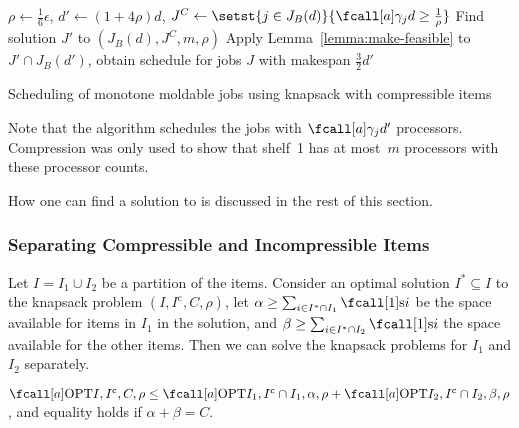 \begin{algorithm}
  $\rho \leftarrow \frac{1}{6}\epsilon$, $d' \leftarrow (1+4\rho)d$,
  $J^C \leftarrow \setst{j \in J_B(d)}{\procnum{j}{d} \geq \frac{1}{\rho}}$ \;
  Find solution $J'$ to $(J_B(d), J^C, m, \rho)$ \label{line:knapsack}\;
  Apply Lemma~\ref{lemma:make-feasible} to $J' \cap J_B(d')$,
    obtain schedule for jobs $J$ with makespan $\frac{3}{2}d'$ \label{line:final-schedule}\;
  
  \caption{Scheduling of monotone moldable jobs using knapsack with compressible items}
  \label{alg:scheduling-simple}
\end{algorithm}

Note that the algorithm schedules the jobs
with $\procnum{j}{d'}$ processors.
Compression was only used to show that
shelf~1 has at most~$m$ processors with these processor counts.

How one can find a solution to is discussed in the rest of this section.


\subsubsection{Separating Compressible and Incompressible Items}

Let $I = I_1 \cup I_2$ be a partition of the items.
Consider an optimal solution $I^* \subseteq I$ to the knapsack problem $(I, I^\mathrm{c}, C, \rho)$,
let $\alpha \geq \sum_{i \in I^* \cap I_1} \s{i}$ be the space available for items in $I_1$ in the solution,
and $\beta \geq \sum_{i \in I^* \cap I_2} \s{i}$ the space available for the other items.
Then we can solve the knapsack problems for $I_1$ and $I_2$ separately.

\begin{lemma}
  \label{lemma:knapsack-separate}
  $\KPCOPT{I, I^\mathrm{c}, C, \rho} \leq \KPCOPT{I_1, I^\mathrm{c} \cap I_1, \alpha, \rho}
  + \KPCOPT{I_2, I^\mathrm{c} \cap I_2, \beta, \rho}$,
  and equality holds if $\alpha + \beta = C$.
\end{lemma}

